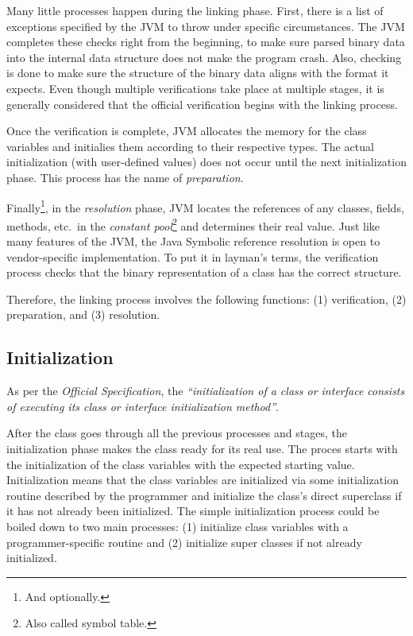\documentclass[english,runningheads,a4paper]{llncs}[2018/03/10]
\begin{document}
Many little processes happen during the linking phase. First, there is a list of
exceptions specified by the JVM to throw under specific circumstances. The JVM
completes these checks right from the beginning, to make sure parsed binary data
into the internal data structure does not make the program crash. Also, checking
is done to make sure the structure of the binary data aligns with the format it
expects. Even though multiple verifications take place at multiple stages, it is
generally considered that the official verification begins with the linking
process.

Once the verification is complete, JVM allocates the memory for the class
variables and initialies them according to their respective types. The actual
initialization (with user-defined values) does not occur until the next
initialization phase. This process has the name of \textit{preparation}.

Finally\footnote{And optionally.}, in the \textit{resolution} phase, JVM locates
the references of any classes, fields, methods, etc.\ in the \textit{constant
pool}\footnote{Also called symbol table.} and determines their real value. Just
like many features of the JVM, the Java Symbolic reference resolution is open to
vendor-specific implementation. To put it in layman's terms, the verification
process checks that the binary representation of a class has the correct
structure.

Therefore, the linking process involves the following functions: (1)
verification, (2) preparation, and (3) resolution.

\subsection*{Initialization}
As per the \textit{Official Specification}, the \textit{``initialization of a
class or interface consists of executing its class or interface initialization
method''}.

After the class goes through all the previous processes and stages, the
initialization phase makes the class ready for its real use. The proces starts
with the initialization of the class variables with the expected starting value.
Initialization means that the class variables are initialized via some
initialization routine described by the programmer and initialize the class's
direct superclass if it has not already been initialized. The simple
initialization process could be boiled down to two main processes: (1)
initialize class variables with a programmer-specific routine and (2) initialize
super classes if not already initialized.
\end{document}
